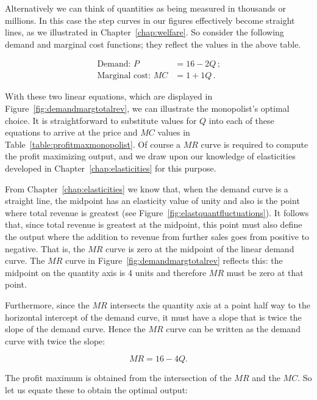 Alternatively we can think of quantities as being measured in thousands or millions. In this case the step curves in our figures effectively become straight lines, as we illustrated in Chapter~\ref{chap:welfare}. So consider the following demand and marginal cost functions; they reflect the values in the above table.

\begin{align*}
\text{Demand: }P&=16-2Q\,\text{;}	\\
\text{Marginal cost: }MC&=1+1Q\,\text{.}
\end{align*}

With these two linear equations, which are displayed in Figure~\ref{fig:demandmargtotalrev}, we can illustrate the monopolist's optimal choice. It is straightforward to substitute values for $Q$ into each of these equations to arrive at the price and $MC$ values in Table~\ref{table:profitmaxmonopolist}. Of course a $MR$ curve is required to compute the profit maximizing output, and we draw upon our knowledge of elasticities developed in Chapter~\ref{chap:elasticities} for this purpose.



From Chapter~\ref{chap:elasticities} we know that, when the demand curve is a straight line, the midpoint has an elasticity value of unity and also is the point where total revenue is greatest (see Figure~\ref{fig:elastquantfluctuations}). It follows that, since total revenue is greatest at the midpoint, this point must also define the output where the addition to revenue from further sales goes from positive to negative. That is, the $MR$ curve is zero at the midpoint of the linear demand curve. The $MR$ curve in Figure~\ref{fig:demandmargtotalrev} reflects this: the midpoint on the quantity axis is 4 units and therefore $MR$ must be zero at that point.

Furthermore, since the $MR$ intersects the quantity axis at a point half way to the horizontal intercept of the demand curve, it must have a slope that is twice the slope of the demand curve. Hence the $MR$ curve can be written as the demand curve with twice the slope: 

\begin{equation*}
MR=16-4Q.
\end{equation*}

The profit maximum is obtained from the intersection of the $MR$ and the $MC$. So let us equate these to obtain the optimal output:

